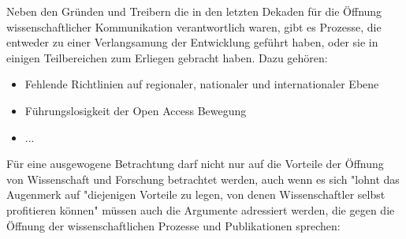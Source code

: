 Neben den Gründen und Treibern die in den letzten Dekaden für die Öffnung wissenschaftlicher Kommunikation verantwortlich waren, gibt es Prozesse, die entweder zu einer Verlangsamung der Entwicklung geführt haben, oder sie in einigen Teilbereichen zum Erliegen gebracht haben. Dazu gehören:

\begin{itemize}
\item Fehlende Richtlinien auf regionaler, nationaler und internationaler Ebene
\item Führungslosigkeit der Open Access Bewegung
\item ...
\end{itemize}

Für eine ausgewogene Betrachtung darf nicht nur auf die Vorteile der Öffnung von Wissenschaft und Forschung betrachtet werden, auch wenn es sich "lohnt das Augenmerk  auf "diejenigen Vorteile zu legen, von denen Wissenschaftler selbst profitieren können" \cite{muller_2010_open} müssen auch die Argumente adressiert werden, die gegen die Öffnung der wissenschaftlichen Prozesse und Publikationen sprechen:

